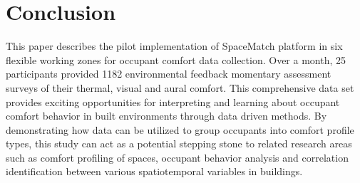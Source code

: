\documentclass[]{interact}
\theoremstyle{plain}%
\theoremstyle{definition}
\theoremstyle{remark}
\begin{document}
\section{Conclusion}
This paper describes the pilot implementation of SpaceMatch platform in six flexible working zones for occupant comfort data collection. Over a month, 25 participants provided 1182 environmental feedback momentary assessment surveys of their thermal, visual and aural comfort. This comprehensive data set provides exciting opportunities for interpreting and learning about occupant comfort behavior in built environments through data driven methods. By demonstrating how data can be utilized to group occupants into comfort profile types, this study can act as a potential stepping stone to related research areas such as comfort profiling of spaces, occupant behavior analysis and correlation identification between various spatiotemporal variables in buildings. 


\end{document}
